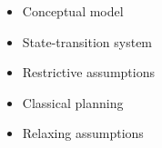 \begin{itemize}
 \item Conceptual model
 \item State-transition system
 \item Restrictive assumptions
 \item Classical planning
 \item Relaxing assumptions
\end{itemize}


